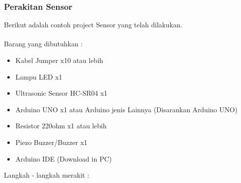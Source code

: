 \subsubsection{Perakitan Sensor}
Berikut adalah contoh project Sensor yang telah dilakukan.\\\\ Barang yang dibutuhkan : 
\begin{itemize}
	\item Kabel Jumper x10 atau lebih
	\item Lampu LED x1
	\item Ultrasonic Sensor HC-SR04 x1
	\item Arduino UNO x1 atau Arduino jenis Lainnya (Disarankan Arduino UNO)
	\item Resistor 220ohm x1 atau lebih
	\item Piezo Buzzer/Buzzer x1
	\item Arduino IDE (Download in PC)
\end{itemize}
Langkah - langkah merakit : 

